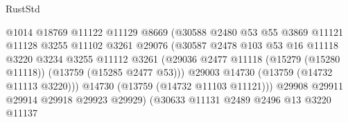 \begin{lexlean}{RustStd}
\begin{coremodule}
                                          @1014
                                          @18769
                                          @11122
                                          @11129
                                          @8669
                                          (@30588
                                            @2480
                                            @53
                                            @55
                                            @3869
                                            @11121
                                            @11128
                                            @3255
                                            @11102
                                            @3261
                                            @29076
                                            (@30587
                                              @2478
                                              @103
                                              @53
                                              @16
                                              @11118
                                              @3220
                                              @3234
                                              @3255
                                              @11112
                                              @3261
                                              (@29036
                                                @2477
                                                @11118
                                                (@15279 (@15280 @11118))
                                                (@13759 (@15285 @2477 @53)))
                                              @29003
                                              @14730
                                              (@13759 (@14732 @11113 @3220)))
                                            @14730
                                            (@13759 (@14732 @11103 @11121)))
                                          @29908
                                          @29911
                                          @29914
                                          @29918
                                          @29923
                                          @29929)
                                        (@30633
                                          @11131
                                          @2489
                                          @2496
                                          @13
                                          @3220
                                          @11137

\end{coremodule}
\end{lexlean}
